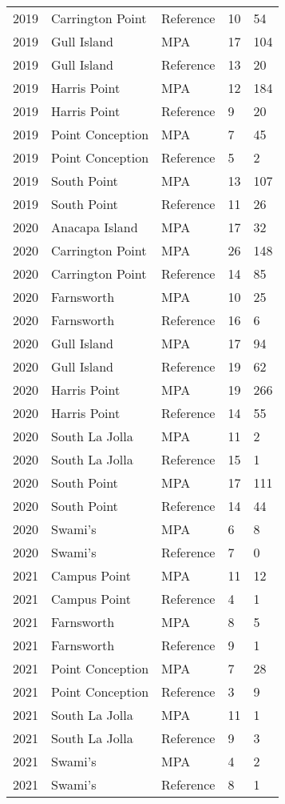 \documentclass[11pt,
  english,
  letterpaper,
]{article}
\begin{document}
\begin{longtable}[t]{l>{\raggedright\arraybackslash}p{3cm}lll}
2019 & Carrington Point & Reference & 10 & 54\\
2019 & Gull Island & MPA & 17 & 104\\
2019 & Gull Island & Reference & 13 & 20\\
2019 & Harris Point & MPA & 12 & 184\\
2019 & Harris Point & Reference & 9 & 20\\
2019 & Point Conception & MPA & 7 & 45\\
2019 & Point Conception & Reference & 5 & 2\\
2019 & South Point & MPA & 13 & 107\\
2019 & South Point & Reference & 11 & 26\\
2020 & Anacapa Island & MPA & 17 & 32\\
2020 & Carrington Point & MPA & 26 & 148\\
2020 & Carrington Point & Reference & 14 & 85\\
2020 & Farnsworth & MPA & 10 & 25\\
2020 & Farnsworth & Reference & 16 & 6\\
2020 & Gull Island & MPA & 17 & 94\\
2020 & Gull Island & Reference & 19 & 62\\
2020 & Harris Point & MPA & 19 & 266\\
2020 & Harris Point & Reference & 14 & 55\\
2020 & South La Jolla & MPA & 11 & 2\\
2020 & South La Jolla & Reference & 15 & 1\\
2020 & South Point & MPA & 17 & 111\\
2020 & South Point & Reference & 14 & 44\\
2020 & Swami's & MPA & 6 & 8\\
2020 & Swami's & Reference & 7 & 0\\
2021 & Campus Point & MPA & 11 & 12\\
2021 & Campus Point & Reference & 4 & 1\\
2021 & Farnsworth & MPA & 8 & 5\\
2021 & Farnsworth & Reference & 9 & 1\\
2021 & Point Conception & MPA & 7 & 28\\
2021 & Point Conception & Reference & 3 & 9\\
2021 & South La Jolla & MPA & 11 & 1\\
2021 & South La Jolla & Reference & 9 & 3\\
2021 & Swami's & MPA & 4 & 2\\
2021 & Swami's & Reference & 8 & 1\\*
\end{longtable}
\endgroup{}
\endgroup{}
\end{document}
